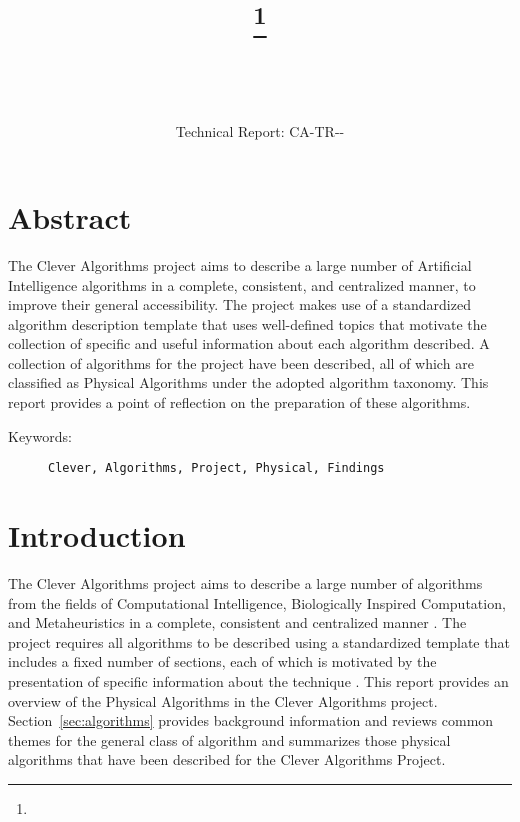 \documentclass[a4paper, 11pt]{article}
\title{{\myreporttitle}\footnote{\myreportlicense}}
\author{\myreportauthor\\{\myreportemail}\\\small\myreportproject}
\date{\myreportfulldate\\{\small{Technical Report: CA-TR-{\myreportdate}-\myreportversion}}}
\begin{document}
\maketitle

\section*{Abstract} 
The Clever Algorithms project aims to describe a large number of Artificial Intelligence algorithms in a complete, consistent, and centralized manner, to improve their general accessibility. 
The project makes use of a standardized algorithm description template that uses well-defined topics that motivate the collection of specific and useful information about each algorithm described.
A collection of algorithms for the project have been described, all of which are classified as Physical Algorithms under the adopted algorithm taxonomy.
This report provides a point of reflection on the preparation of these algorithms.

\begin{description}
	\item[Keywords:] {\small\texttt{Clever, Algorithms, Project, Physical, Findings}}
\end{description} 

\section{Introduction}
\label{sec:introduction}
The Clever Algorithms project aims to describe a large number of algorithms from the fields of Computational Intelligence, Biologically Inspired Computation, and Metaheuristics in a complete, consistent and centralized manner \cite{Brownlee2010}.
The project requires all algorithms to be described using a standardized template that includes a fixed number of sections, each of which is motivated by the presentation of specific information about the technique \cite{Brownlee2010a}.
This report provides an overview of the Physical Algorithms in the Clever Algorithms project. 
Section~\ref{sec:algorithms} provides background information and reviews common themes for the general class of algorithm and summarizes those physical algorithms that have been described for the Clever Algorithms Project.

% 
% 
\end{document}
